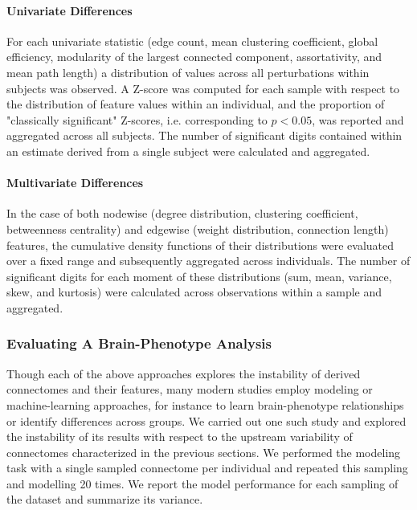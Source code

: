 \documentclass[fleqn,10pt]{SelfArx} %
\begin{document}
\paragraph{Univariate Differences} For each univariate statistic (edge count, mean clustering coefficient, global
efficiency, modularity of the largest connected component, assortativity, and mean path length) a distribution of
values across all perturbations within subjects was observed. A Z-score was computed for each sample with respect to
the distribution of feature values within an individual, and the proportion of "classically significant" Z-scores, i.e.
corresponding to $p < 0.05$, was reported and aggregated across all subjects. The number of significant digits
contained within an estimate derived from a single subject were calculated and aggregated.

\paragraph{Multivariate Differences} In the case of both nodewise (degree distribution, clustering coefficient,
betweenness centrality) and edgewise (weight distribution, connection length) features, the cumulative density
functions of their distributions were evaluated over a fixed range and subsequently aggregated across individuals. The
number of significant digits for each moment of these distributions (sum, mean, variance, skew, and kurtosis) were
calculated across observations within a sample and aggregated.

\subsubsection*{Evaluating A Brain-Phenotype Analysis}
Though each of the above approaches explores the instability of derived connectomes and their features, many modern
studies employ modeling or machine-learning approaches, for instance to learn brain-phenotype relationships or identify
differences across groups. We carried out one such study and explored the instability of its results with respect to
the upstream variability of connectomes characterized in the previous sections. We performed the modeling task with a
single sampled connectome per individual and repeated this sampling and modelling 20 times. We report the model
performance for each sampling of the dataset and summarize its variance.
\end{document}
